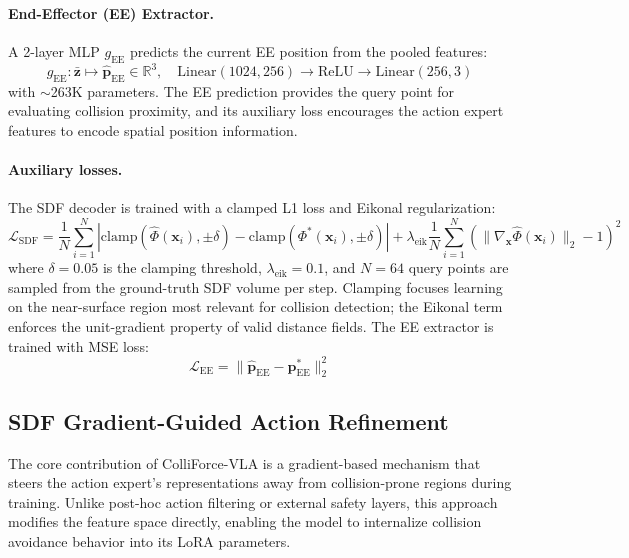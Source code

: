 \paragraph{End-Effector (EE) Extractor.} A 2-layer MLP $g_\mathrm{EE}$ predicts the current EE position from the pooled features:
\begin{equation}\label{eq:ee_extractor}
g_\mathrm{EE}: \bar{\mathbf{z}} \mapsto \hat{\mathbf{p}}_\mathrm{EE} \in \mathbb{R}^3, \quad \mathrm{Linear}(1024, 256) \to \mathrm{ReLU} \to \mathrm{Linear}(256, 3)
\end{equation}
with ${\sim}$263K parameters. The EE prediction provides the query point for evaluating collision proximity, and its auxiliary loss encourages the action expert features to encode spatial position information.

\paragraph{Auxiliary losses.} The SDF decoder is trained with a clamped L1 loss and Eikonal regularization:
\begin{equation}\label{eq:loss_sdf}
\mathcal{L}_\mathrm{SDF} = \frac{1}{N} \sum_{i=1}^{N} \left| \mathrm{clamp}(\hat{\Phi}(\mathbf{x}_i), \pm\delta) - \mathrm{clamp}(\Phi^*(\mathbf{x}_i), \pm\delta) \right| + \lambda_\mathrm{eik} \frac{1}{N} \sum_{i=1}^{N} \left( \|\nabla_{\mathbf{x}} \hat{\Phi}(\mathbf{x}_i)\|_2 - 1 \right)^2
\end{equation}
where $\delta = 0.05$ is the clamping threshold, $\lambda_\mathrm{eik} = 0.1$, and $N = 64$ query points are sampled from the ground-truth SDF volume per step. Clamping focuses learning on the near-surface region most relevant for collision detection; the Eikonal term enforces the unit-gradient property of valid distance fields. The EE extractor is trained with MSE loss:
\begin{equation}\label{eq:loss_ee}
\mathcal{L}_\mathrm{EE} = \|\hat{\mathbf{p}}_\mathrm{EE} - \mathbf{p}^*_\mathrm{EE}\|_2^2
\end{equation}

\subsection{SDF Gradient-Guided Action Refinement}\label{sec:gradient_refinement}

The core contribution of ColliForce-VLA is a gradient-based mechanism that steers the action expert's representations away from collision-prone regions during training. Unlike post-hoc action filtering or external safety layers, this approach modifies the feature space directly, enabling the model to internalize collision avoidance behavior into its LoRA parameters.

